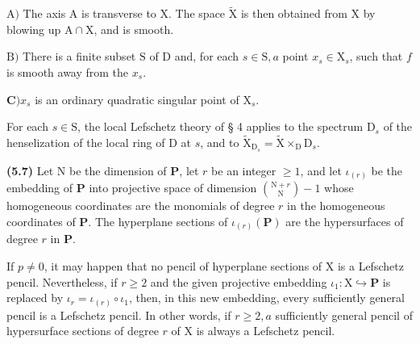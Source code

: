 \documentclass[10pt,leqno]{article}
\begin{document}
\noindent \(\mathrm{A})\) The axis \(\mathrm{A}\) is transverse to \(\mathrm{X}\). The space \(\widetilde{\mathrm{X}}\) is then obtained from \(\mathrm{X}\) by blowing up \(\mathrm{A}\cap \mathrm{X}\), and is smooth.\par

\clearpage

\label{physical-21}\par\smallskip

\noindent \(\mathrm{B})\) There is a finite subset \(\mathrm{S}\) of \(\mathrm{D}\) and, for each \(s\in \mathrm{S}, a\) point \(x_{s}\in \mathrm{X}_{s}\), such that \(f\) is smooth away from the \(x_{s}\).\par

\noindent \(\mathbf{C}) x_{s}\) is an ordinary quadratic singular point of \(\mathrm{X}_{s}\).\par

\noindent For each \(s\in \mathrm{S}\), the local Lefschetz theory of § 4 applies to the spectrum \(\mathrm{D}_{s}\) of the henselization of the local ring of \(\mathrm{D}\) at \(s\), and to \(\widetilde{\mathrm{X}}_{\mathrm{D}_{s}}=\widetilde{\mathrm{X}}\times _{\mathrm{D}} \mathrm{D}_{s}\).\par

\noindent \textbf{(5.7)} Let \(\mathrm{N}\) be the dimension of \(\mathbf{P}\), let \(r\) be an integer \(\geq 1\), and let \(\iota _{(r)}\) be the embedding of \(\mathbf{P}\) into projective space of dimension \(\binom{\mathrm{N}+r}{\mathrm{N}}- 1\) whose homogeneous coordinates are the monomials of degree \(r\) in the homogeneous coordinates of \(\mathbf{P}\). The hyperplane sections of \(\iota _{(r)}(\mathbf{P})\) are the hypersurfaces of degree \(r\) in \(\mathbf{P}\).\par

\noindent If \(p\ne 0\), it may happen that no pencil of hyperplane sections of \(\mathrm{X}\) is a Lefschetz pencil. Nevertheless, if \(r\geq 2\) and the given projective embedding \(\iota _{1}:\mathrm{X}\hookrightarrow \mathbf{P}\) is replaced by \(\iota _{r}=\iota _{(r)}\circ \iota _{1}\), then, in this new embedding, every sufficiently general pencil is a Lefschetz pencil. In other words, if \(r\geq 2, a\) sufficiently general pencil of hypersurface sections of degree \(r\) of \(\mathrm{X}\) is always a Lefschetz pencil.\par
\end{document}
